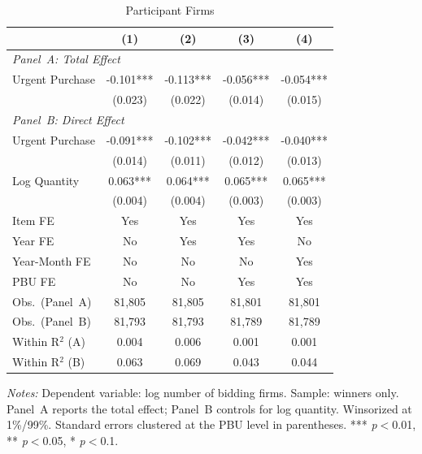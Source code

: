 \begin{table}[ht]
  \centering
  \caption{Participant Firms}
  \label{tab:firms}
  \small
  \begin{threeparttable}
  \begin{tabular}{lcccc}
    \hline\hline
    & (1) & (2) & (3) & (4) \\
    \hline
    \multicolumn{5}{l}{\textit{Panel~A: Total Effect}} \\[3pt]
    Urgent Purchase & -0.101*** & -0.113*** & -0.056*** & -0.054*** \\
     & (0.023) & (0.022) & (0.014) & (0.015) \\[3pt]
    \hline
    \multicolumn{5}{l}{\textit{Panel~B: Direct Effect}} \\[3pt]
    Urgent Purchase & -0.091*** & -0.102*** & -0.042*** & -0.040*** \\
     & (0.014) & (0.011) & (0.012) & (0.013) \\[3pt]
    Log Quantity & 0.063*** & 0.064*** & 0.065*** & 0.065*** \\
     & (0.004) & (0.004) & (0.003) & (0.003) \\[3pt]
    \hline
    Item FE & Yes & Yes & Yes & Yes \\
    Year FE & No & Yes & Yes & No \\
    Year-Month FE & No & No & No & Yes \\
    PBU FE & No & No & Yes & Yes \\
    Obs.\ (Panel~A) & 81,805 & 81,805 & 81,801 & 81,801 \\
    Obs.\ (Panel~B) & 81,793 & 81,793 & 81,789 & 81,789 \\
    Within R$^2$ (A) & 0.004 & 0.006 & 0.001 & 0.001 \\
    Within R$^2$ (B) & 0.063 & 0.069 & 0.043 & 0.044 \\
    \hline\hline
  \end{tabular}
  \begin{tablenotes}
    \small
    \item \textit{Notes:} Dependent variable: log number of bidding firms. Sample: winners only. Panel~A reports the total effect; Panel~B controls for log quantity. Winsorized at 1\%/99\%. Standard errors clustered at the PBU level in parentheses. *** \textit{p}$<$0.01, ** \textit{p}$<$0.05, * \textit{p}$<$0.1.
  \end{tablenotes}
  \end{threeparttable}
\end{table}

